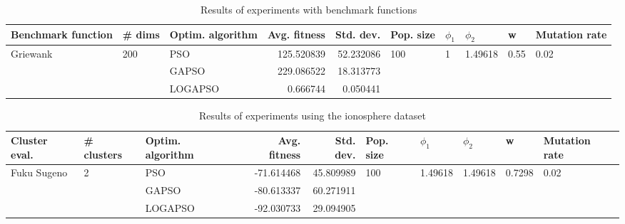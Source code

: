 \documentclass{article}
\begin{document}
\begin{table}
\centering
\caption{Results of experiments with benchmark functions}
\begin{tabular}{lllrrlllll}
\toprule
       Benchmark function &              \# dims & Optim. algorithm &  Avg. fitness &  Std. dev. &            Pop. size &         $\phi_{1}$ &               $\phi_{2}$ &                     w &         Mutation rate \\
\midrule
\multirow{3}{*}{Griewank} & \multirow{3}{*}{200} &              PSO &    125.520839 &  52.232086 & \multirow{3}{*}{100} & \multirow{3}{*}{1} & \multirow{3}{*}{1.49618} & \multirow{3}{*}{0.55} & \multirow{3}{*}{0.02} \\
                          &                      &            GAPSO &    229.086522 &  18.313773 &                      &                    &                          &                       &                       \\
                          &                      &          LOGAPSO &      0.666744 &   0.050441 &                      &                    &                          &                       &                       \\
\bottomrule
\end{tabular}
\end{table}
\begin{table}
\centering
\caption{Results of experiments using the ionosphere dataset}
\begin{tabular}{lllrrlllll}
\toprule
               Cluster eval. &        \# clusters & Optim. algorithm &  Avg. fitness &  Std. dev. &            Pop. size &               $\phi_{1}$ &               $\phi_{2}$ &                       w &         Mutation rate \\
\midrule
\multirow{3}{*}{Fuku Sugeno} & \multirow{3}{*}{2} &              PSO &    -71.614468 &  45.809989 & \multirow{3}{*}{100} & \multirow{3}{*}{1.49618} & \multirow{3}{*}{1.49618} & \multirow{3}{*}{0.7298} & \multirow{3}{*}{0.02} \\
                             &                    &            GAPSO &    -80.613337 &  60.271911 &                      &                          &                          &                         &                       \\
                             &                    &          LOGAPSO &    -92.030733 &  29.094905 &                      &                          &                          &                         &                       \\
\bottomrule
\end{tabular}
\end{table}
\end{document}
